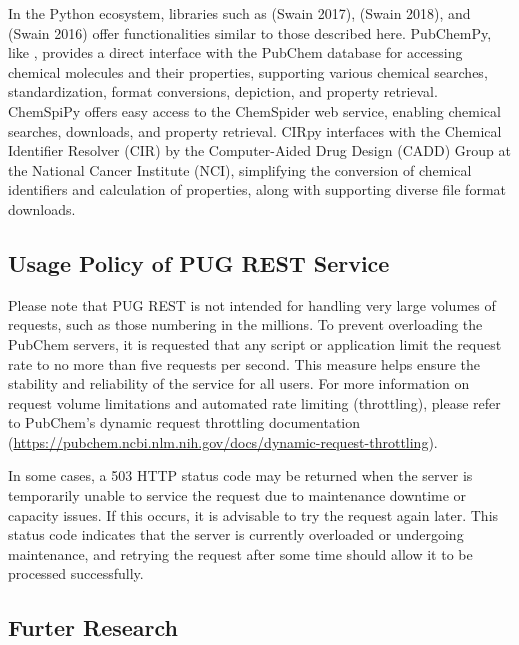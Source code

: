 In the Python ecosystem, libraries such as  (Swain 2017),  (Swain 2018), and  (Swain 2016) offer functionalities similar to those described here. PubChemPy, like , provides a direct interface with the PubChem database for accessing chemical molecules and their properties, supporting various chemical searches, standardization, format conversions, depiction, and property retrieval. ChemSpiPy offers easy access to the ChemSpider web service, enabling chemical searches, downloads, and property retrieval. CIRpy interfaces with the Chemical Identifier Resolver (CIR) by the Computer-Aided Drug Design (CADD) Group at the National Cancer Institute (NCI), simplifying the conversion of chemical identifiers and calculation of properties, along with supporting diverse file format downloads.

\hypertarget{usage-policy-of-pug-rest-service}{%
\subsection{Usage Policy of PUG REST Service}\label{usage-policy-of-pug-rest-service}}

Please note that PUG REST is not intended for handling very large volumes of requests, such as those numbering in the millions. To prevent overloading the PubChem servers, it is requested that any script or application limit the request rate to no more than five requests per second. This measure helps ensure the stability and reliability of the service for all users. For more information on request volume limitations and automated rate limiting (throttling), please refer to PubChem's dynamic request throttling documentation (\url{https://pubchem.ncbi.nlm.nih.gov/docs/dynamic-request-throttling}).

In some cases, a 503 HTTP status code may be returned when the server is temporarily unable to service the request due to maintenance downtime or capacity issues. If this occurs, it is advisable to try the request again later. This status code indicates that the server is currently overloaded or undergoing maintenance, and retrying the request after some time should allow it to be processed successfully.

\hypertarget{furter-research}{%
\subsection{Furter Research}\label{furter-research}}

